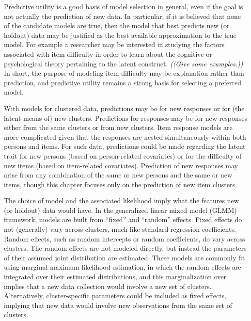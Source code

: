 Predictive utility is a good basis of model selection in general, even if the goal is not actually the prediction of new data. In particular, if it is believed that none of the candidate models are true, then the model that best predicts new (or holdout) data may be justified as the best available approximation to the true model. 
For example a researcher may be interested in studying the factors associated with item difficulty in order to learn about the cognitive or psychological theory pertaining to the latent construct. \emph{((Give some examples.))} In short, the purpose of modeling item difficulty may be explanation rather than prediction, and predictive utility remains a strong basis for selecting a preferred model.

With models for clustered data, predictions may be for new responses or for (the latent means of) new clusters. Predictions for responses may be for new responses either from the same clusters or from new clusters. Item response models are more complicated given that the responses are nested simultaneously within both persons and items. For such data, predictions could be made regarding the latent trait for new persons (based on person-related covariates) or for the difficulty of new items (based on item-related covariates). Prediction of new responses may arise from any combination of the same or new persons and the same or new items, though this chapter focuses only on the prediction of new item clusters.

The choice of model and the associated likelihood imply what the features new (or holdout) data would have. In the generalized linear mixed model (GLMM) framework, models are built from ``fixed'' and ``random'' effects. Fixed effects do not (generally) vary across clusters, much like standard regression coefficients. Random effects, such as random intercepts or random coefficients, do vary across clusters. The random effects are not modeled directly, but instead the parameters of their assumed joint distribution are estimated. These models are commonly fit using marginal maximum likelihood estimation, in which the random effects are integrated over their estimated distributions, and this marginalization over implies that a new data collection would involve a new set of clusters. Alternatively, cluster-specific parameters could be included as fixed effects, implying that new data would involve new observations from the same set of clusters.

